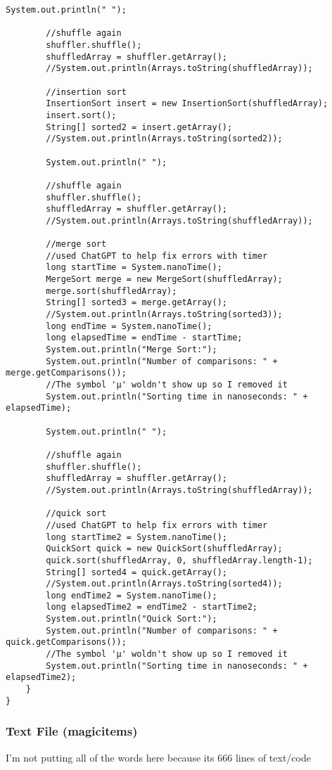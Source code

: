 \documentclass[10pt]{article}
\begin{document}
\begin{lstlisting}[frame=single, ]
        System.out.println(" ");

        //shuffle again
        shuffler.shuffle();
        shuffledArray = shuffler.getArray();
        //System.out.println(Arrays.toString(shuffledArray));

        //insertion sort
        InsertionSort insert = new InsertionSort(shuffledArray);
        insert.sort();
        String[] sorted2 = insert.getArray();
        //System.out.println(Arrays.toString(sorted2));

        System.out.println(" ");

        //shuffle again
        shuffler.shuffle();
        shuffledArray = shuffler.getArray();
        //System.out.println(Arrays.toString(shuffledArray));  

        //merge sort
        //used ChatGPT to help fix errors with timer
        long startTime = System.nanoTime();
        MergeSort merge = new MergeSort(shuffledArray);
        merge.sort(shuffledArray);
        String[] sorted3 = merge.getArray();
        //System.out.println(Arrays.toString(sorted3));
        long endTime = System.nanoTime();
        long elapsedTime = endTime - startTime;
        System.out.println("Merge Sort:");
        System.out.println("Number of comparisons: " + merge.getComparisons());
        //The symbol 'μ' woldn't show up so I removed it
        System.out.println("Sorting time in nanoseconds: " + elapsedTime);

        System.out.println(" ");

        //shuffle again
        shuffler.shuffle();
        shuffledArray = shuffler.getArray();
        //System.out.println(Arrays.toString(shuffledArray));

        //quick sort
        //used ChatGPT to help fix errors with timer
        long startTime2 = System.nanoTime();
        QuickSort quick = new QuickSort(shuffledArray);
        quick.sort(shuffledArray, 0, shuffledArray.length-1);
        String[] sorted4 = quick.getArray();
        //System.out.println(Arrays.toString(sorted4));
        long endTime2 = System.nanoTime();
        long elapsedTime2 = endTime2 - startTime2;
        System.out.println("Quick Sort:");
        System.out.println("Number of comparisons: " + quick.getComparisons());
        //The symbol 'μ' woldn't show up so I removed it
        System.out.println("Sorting time in nanoseconds: " + elapsedTime2);
    }
}
\end{lstlisting}


\subsubsection{Text File (magicitems)}
\lstset{numbers=left, numberstyle=\tiny, stepnumber=1, numbersep=5pt, basicstyle=\footnotesize\ttfamily}
I'm not putting all of the words here because its 666 lines of text/code
\end{document}
